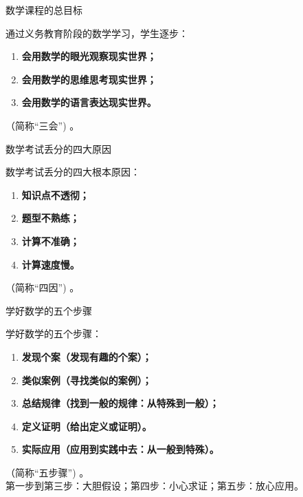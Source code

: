 \begin{frame}[t]{数学课程的总目标}
\begin{spacing}{1.5} %
{\Large
通过义务教育阶段的数学学习，学生逐步：\\
\begin{enumerate}[label={\arabic*.}]
\item \textbf{会用数学的眼光观察现实世界；}\\
\item \textbf{会用数学的思维思考现实世界；}\\
\item \textbf{会用数学的语言表达现实世界。}\\
\end{enumerate}
（简称“三会”) 。\\
}
\end{spacing}
\end{frame}

\begin{frame}[t]{数学考试丢分的四大原因}
\begin{spacing}{1.5} %
{\Large
数学考试丢分的四大根本原因：\\
\begin{enumerate}[label={\arabic*.}]
\item \textbf{知识点不透彻；}\\
\item \textbf{题型不熟练；}\\
\item \textbf{计算不准确；}\\
\item \textbf{计算速度慢。} \\
\end{enumerate}
（简称“四因”) 。\\
}
\end{spacing}
\end{frame}

\begin{frame}[t]{学好数学的五个步骤}
\begin{spacing}{1.2} %
{\Large
学好数学的五个步骤：\\
\begin{enumerate}[label={\arabic*.}]
\item \textbf{发现个案（发现有趣的个案）；}\\
\item \textbf{类似案例（寻找类似的案例）；}\\
\item \textbf{总结规律（找到一般的规律：从特殊到一般）；}\\
\item \textbf{定义证明（给出定义或证明）。} \\
\item \textbf{实际应用（应用到实践中去：从一般到特殊）。} \\
\end{enumerate}
（简称“五步骤”) 。\\
\alert{第一步到第三步：大胆假设；第四步：小心求证；第五步：放心应用。}
}
\end{spacing}
\end{frame}